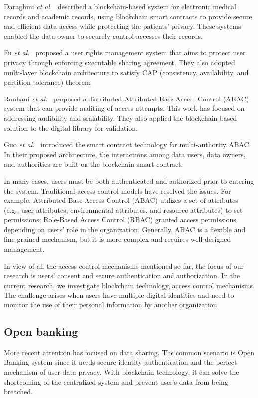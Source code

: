 Daraghmi \emph{et al.}~\cite{daraghmi2019medchain,daraghmi2019unichain} described a blockchain-based system for electronic medical records and academic records, using blockchain smart contracts to provide secure and efficient data access while protecting the patients' privacy. These systems enabled the data owner to securely control accesses their records.\par

Fu \emph{et al.}~\cite{fu2020soteria} proposed a user rights management system that aims to protect user privacy through enforcing executable sharing agreement. They also adopted multi-layer blockchain architecture to satisfy CAP (consistency, availability, and partition tolerance) theorem.\par

Rouhani \emph{et al.}~\cite{rouhani2020distributed} proposed a distributed Attributed-Base Access Control (ABAC) system that can provide auditing of access attempts. This work has focused on addressing audibility and scalability. They also applied the blockchain-based solution to the digital library for validation.\par

Guo \emph{et al.}~\cite{guo2019multi} introduced the smart contract technology for multi-authority ABAC. In their proposed architecture, the interactions among data users, data owners, and authorities are built on the blockchain smart contract.\par

In many cases, users must be both authenticated and authorized prior to entering the system. Traditional access control models have resolved the issues. For example, Attributed-Base Access Control (ABAC) utilizes a set of attributes (e.g., user attributes, environmental attributes, and resource attributes) to set permissions; Role-Based Access Control (RBAC) granted access permissions depending on users' role in the organization. Generally, ABAC is a flexible and fine-grained mechanism, but it is more complex and requires well-designed management.\par

In view of all the access control mechanisms mentioned so far, the focus of our research is users' consent and secure authentication and authorization. In the current research, we investigate blockchain technology, access control mechanisms. The challenge arises when users have multiple digital identities and need to monitor the use of their personal information by another organization.\par

\subsection{Open banking}
More recent attention has focused on data sharing. The common scenario is Open Banking system since it needs secure identity authentication and the perfect mechanism of user data privacy. With blockchain technology, it can solve the shortcoming of the centralized system and prevent user's data from being breached.